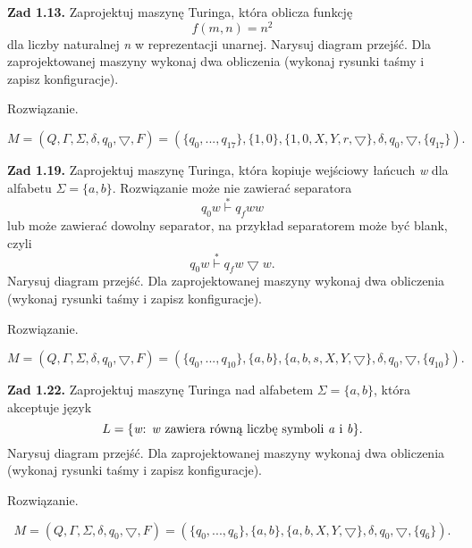 \documentclass[12pt]{article}
\begin{document}
\newpage

\noindent\textbf{Zad 1.13.} Zaprojektuj maszynę Turinga, która oblicza funkcję
\[f(m,n)=n^2\]
dla liczby naturalnej \textit{n} w reprezentacji unarnej. Narysuj diagram przejść. Dla zaprojektowanej maszyny wykonaj dwa obliczenia (wykonaj rysunki taśmy i zapisz konfiguracje).

 Rozwiązanie.
 
\[M=(Q,\Gamma,\Sigma,\delta,q_0,\bigtriangledown,F)=(\{q_0,...,q_{17}\},\{1,0\},\{1,0,X,Y,r,\bigtriangledown\},\delta,q_0,\bigtriangledown,\{q_{17}\}).\]

\newpage

\noindent\textbf{Zad 1.19.} Zaprojektuj maszynę Turinga, która kopiuje wejściowy łańcuch \textit{w} dla alfabetu $\Sigma=\{a,b\}$. Rozwiązanie może nie zawierać separatora
\[q_0w \overset{*}{\vdash} q_fww\]
lub  może  zawierać  dowolny  separator,  na  przykład  separatorem  może  być blank, czyli
\[q_0w \overset{*}{\vdash} q_fw \bigtriangledown w.\]
Narysuj diagram przejść. Dla zaprojektowanej maszyny wykonaj dwa obliczenia (wykonaj rysunki taśmy i zapisz konfiguracje).

 Rozwiązanie.
 
\[M=(Q,\Gamma,\Sigma,\delta,q_0,\bigtriangledown,F)=(\{q_0,...,q_{10}\},\{a,b\},\{a,b,s,X,Y,\bigtriangledown\},\delta,q_0,\bigtriangledown,\{q_{10}\}).\]

\newpage

\noindent\textbf{Zad 1.22.} Zaprojektuj  maszynę  Turinga  nad  alfabetem $\Sigma=\{a,b\}$,  która akceptuje język
\[L=\{\text{\textit{w}: \textit{w} zawiera  równą liczbę symboli \textit{a} i \textit{b}}\}.\]
Narysuj diagram przejść. Dla zaprojektowanej maszyny wykonaj dwa obliczenia (wykonaj rysunki taśmy i zapisz konfiguracje).

 Rozwiązanie.
 
\[M=(Q,\Gamma,\Sigma,\delta,q_0,\bigtriangledown,F)=(\{q_0,...,q_6\},\{a,b\},\{a,b,X,Y,\bigtriangledown\},\delta,q_0,\bigtriangledown,\{q_6\}).\]

\vspace{20pt}
\end{document}
